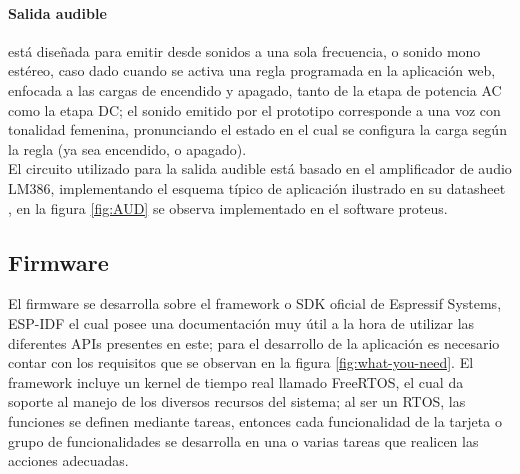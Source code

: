 %		
%	
	
	\paragraph{Salida audible}
		está diseñada para emitir desde sonidos a una sola frecuencia, o sonido mono estéreo, caso dado cuando se activa una regla programada en la aplicación web, enfocada a las cargas de encendido y apagado, tanto de la etapa de potencia AC como la etapa DC; el sonido emitido por el prototipo corresponde a una voz con tonalidad femenina, pronunciando el estado en el cual se configura la carga según la regla (ya sea encendido, o apagado).\\
		
		El circuito utilizado para la salida audible está basado en el amplificador de audio LM386, implementando el esquema típico de aplicación ilustrado en su datasheet \cite{LM386}, en la figura \ref{fig:AUD} se observa implementado en el software proteus.
		
		
				
\subsection{Firmware}

El firmware se desarrolla sobre el framework o SDK oficial de Espressif Systems, ESP-IDF el cual posee una documentación \cite{ES} muy útil a la hora de utilizar las diferentes APIs presentes en este; para el desarrollo de la aplicación es necesario contar con los requisitos que se observan en la figura \ref{fig:what-you-need}. El framework incluye un kernel de tiempo real llamado FreeRTOS, el cual da soporte al manejo de los diversos recursos del sistema; al ser un RTOS, las funciones se definen mediante tareas, entonces cada funcionalidad de la tarjeta o grupo de funcionalidades se desarrolla en una o varias tareas que realicen las acciones adecuadas.

